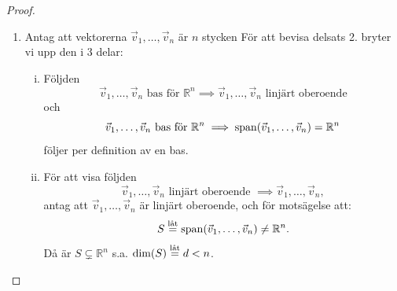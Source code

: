 \begin{theorem}[Bassatsen]
\begin{proof}
\begin{enumerate}
\begin{enumerate}[(a)]
\begin{der}
\begin{equation}
						p\leq n.
					\end{equation}
				\end{der}
				\item Om $p<n$, är $S=\spn(\vec{v}_1,\dots,\vec{v}_p)$ är ett delrum
				till $\mathbb{R}^n$ s.a. $\dim(S)\leq p$. Eftersom $p<n$, $S\subsetneq\mathbb{R}^n$
				då $\dim(\mathbb{R}^n)=n>p\geq\dim(S)$. Altså krävs $p\geq n$ för att
				$\vec{v}_1,\dots,\vec{v}_p$ ska kunna spänna upp $\mathbb{R}^n$.
				\begin{der}
					Altså för en bas krävs det att
					\begin{equation}\label{eq:sats:bas-sts:4}
						p\geq n.
					\end{equation}
				\end{der}
				\item En bas av vektorerna $\vec{v}_1,\dots,\vec{v}_n$ för $\mathbb{R}^n$ kräver att:
				\begin{itemize}
					\item $\spn(\vec{v}_1,\dots,\vec{v}_n)=\mathbb{R}^n$.
					\item $\vec{v}_1,\dots,\vec{v}_n$ är linjärt oberoende.
				\end{itemize}
				Genom att applicera delsats 1. (a) och 1. (b) får vi då att:
				$$
					(p\leq n)\wedge(p\geq n)\iff p=n
				$$
				Altså måste en bas för $\mathbb{R}^n$ ha exakt $n$ vektorer.
 			\end{enumerate}
			\item Antag att vektorerna $\vec{v}_1,\dots,\vec{v}_n$ är $n$ stycken
			För att bevisa delsats 2. bryter vi upp den i 3 delar:
			\begin{enumerate}[(i)]
				\item Följden
				$$
					\vec{v}_1,\dots,\vec{v}_n\text{ bas för }\mathbb{R}^n\implies\vec{v}_1,\dots,\vec{v}_n\text{ linjärt oberoende}
				$$
				och
				$$
					\vec{v}_1,\dots,\vec{v}_n\text{ bas för }\mathbb{R}^n\implies\spn(\vec{v}_1,\dots,\vec{v}_n)=\mathbb{R}^n
				$$
				följer per definition av en bas.
				\item För att visa följden
				$$
					\vec{v}_1,\dots,\vec{v}_n\text{ linjärt oberoende }\implies\vec{v}_1,\dots,\vec{v}_n,
				$$ 
				antag att $\vec{v}_1,\dots,\vec{v}_n$ är linjärt oberoende, och för
				motsägelse att:
				$$
					S\leteq\spn(\vec{v}_1,\dots,\vec{v}_n)\neq\mathbb{R}^n.
				$$
				Då är $S\subsetneq\mathbb{R}^n$ s.a. $\dim(S)\leteq d<n$.


\end{enumerate}
\end{enumerate}
\end{proof}
\end{theorem}
